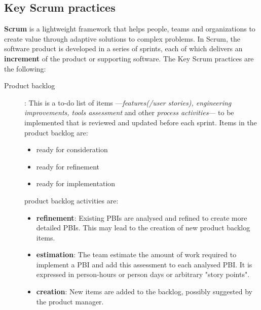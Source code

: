 \subsection{Key Scrum practices}
\textbf{Scrum} is a lightweight framework that helps people, teams and organizations to create value through adaptive solutions to complex problems.
In Scrum, the software product is developed in a series of sprints, each of which delivers an \textbf{increment} of the product or supporting software. The Key Scrum practices are the following:
\begin{description}
   \item[Product backlog]: This is a to-do list of items {---}\textit{features(/user stories), engineering improvements, tools assessment} and other \textit{process activities}{---} to be implemented that is reviewed and updated before each sprint. Items in the product backlog are:
         \begin{itemize}
            \item ready for consideration
            \item ready for refinement
            \item ready for implementation
         \end{itemize}
         product backlog activities are:
         \begin{itemize}
            \item \textbf{refinement}: Existing PBIs are analysed and refined to create more detailed PBIs. This may lead to the creation of new product backlog items.
            \item \textbf{estimation}: The team estimate the amount of work required to implement a PBI and add this assessment to each analysed PBI. It is expressed in person-hours or person days or arbitrary "story points".
            \item \textbf{creation}: New items are added to the backlog, possibly suggested by the product manager.
\end{itemize}
\end{description}
